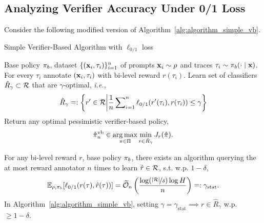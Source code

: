 
\subsection{Analyzing Verifier Accuracy Under 0/1 Loss}
\label{subsec:proof-verifier-accuracy}



Consider the following modified version of   Algorithm~\ref{alg:algorithm_simple_vb}.



\begin{algorithm}[ht]
\caption{Simple Verifier-Based Algorithm with $\ell_{0/1}$ loss}
\begin{algorithmic}[1]
\REQUIRE Base policy $\pi_b$, dataset $\{(\mathbf{x}_i, \tau_i)\}_{i=1}^n$ of prompts $\mathbf{x}_i \sim \rho$ and traces $\tau_i \sim \pi_b(\cdot \mid \mathbf{x})$.
\STATE For every $\tau_i$  annotate $(\mathbf{x}_i, \tau_i)$ with bi-level reward $r(\tau_i)$. %
\STATE Learn set of classifiers $\hat{R}_\gamma \subset {\mathcal{R}}$ that are $\gamma$-optimal, \textit{i.e.}, 
{
\begin{align*}
    \hat{R}_\gamma \mathrel{\mathop=}: \left \{ r' \in {\mathcal{R}} \middle| \frac{1}{n}\sum\nolimits_{i=1}^n\ell_{0/1}(r'(\tau_i), r(\tau_i)) \leq \gamma \right \}
\end{align*}
}\STATE Return any optimal pessimistic verifier-based policy,
{
\begin{align*}
    \vspace{-0.1cm}
    \setlength{\abovedisplayskip}{0pt}
    \setlength{\belowdisplayskip}{0pt}
    \hat{\pi}^\mathrm{vb}_n \in \argmax_{\pi \in \Pi} \min_{r \in \hat{R}_\gamma} J_r(\hat{\pi}).
\end{align*}
}
\end{algorithmic}
\end{algorithm}


\begin{proposition}
    \label{prp:verifier-accuracy-lzone}
    For any bi-level reward $r$, base policy $\pi_b$, 
    there exists an algorithm querying the at most reward annotator $n$ times to learn $\hat{r} \in {\mathcal{R}}$, s.t. w.p. $1-\delta$,  
    {
    \setlength{\abovedisplayskip}{3pt}
    \setlength{\belowdisplayskip}{3pt}
    \begin{align*}
        \mathbb{E}_{\rho,\pi_b} [\ell_{0/1}(r(\tau), \hat{r}(\tau))] =  \widetilde{{\mathcal{O}}}_n \left( \frac{\log(\nicefrac{|\mathcal{R}|}{\delta}) \log H }{n} \right) \mathrel{\mathop=}: \gamma_{\text{stat}}.
    \end{align*}
    In Algorithm~\ref{alg:algorithm_simple_vb}, setting $\gamma = \gamma_{\text{stat}} \implies r \in \hat{R}_\gamma$ w.p. $\ge 1-\delta$.
    }
\end{proposition}




